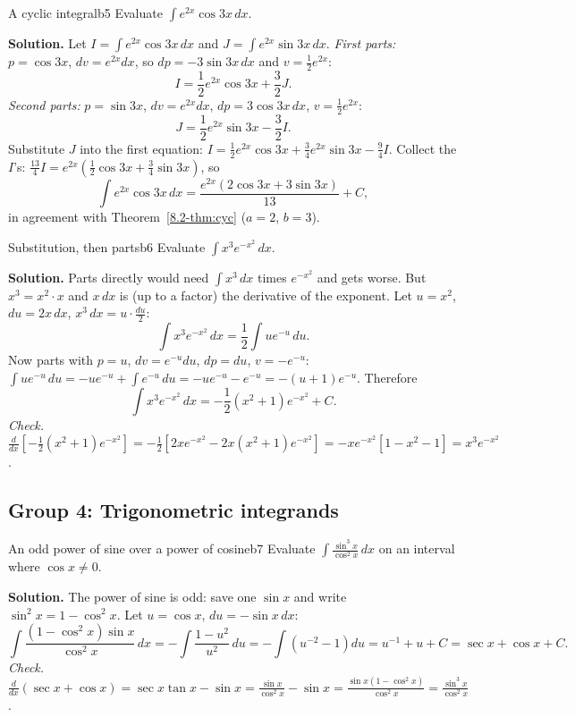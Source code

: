 \documentclass[11pt]{article}
\begin{document}
\begin{exmp}{A cyclic integral}{b5}
Evaluate $\displaystyle\int e^{2x}\cos3x\,dx$.

\textbf{Solution.} Let $I=\int e^{2x}\cos3x\,dx$ and $J=\int e^{2x}\sin3x\,dx$. \emph{First parts:} $p=\cos3x$, $dv=e^{2x}dx$, so $dp=-3\sin3x\,dx$ and $v=\frac12e^{2x}$:
\[I=\frac12e^{2x}\cos3x+\frac32J .\]
\emph{Second parts:} $p=\sin3x$, $dv=e^{2x}dx$, $dp=3\cos3x\,dx$, $v=\frac12e^{2x}$:
\[J=\frac12e^{2x}\sin3x-\frac32I .\]
Substitute $J$ into the first equation: $I=\frac12e^{2x}\cos3x+\frac34e^{2x}\sin3x-\frac94I$. Collect the $I$'s: $\frac{13}4I=e^{2x}\left(\frac12\cos3x+\frac34\sin3x\right)$, so
\[\int e^{2x}\cos3x\,dx=\frac{e^{2x}\left(2\cos3x+3\sin3x\right)}{13}+C ,\]
in agreement with Theorem~\ref{8.2-thm:cyc} ($a=2$, $b=3$).
\end{exmp}

\begin{exmp}{Substitution, then parts}{b6}
Evaluate $\displaystyle\int x^3e^{-x^2}\,dx$.

\textbf{Solution.} Parts directly would need $\int x^3\,dx$ times $e^{-x^2}$ and gets worse. But $x^3=x^2\cdot x$ and $x\,dx$ is (up to a factor) the derivative of the exponent. Let $u=x^2$, $du=2x\,dx$, $x^3\,dx=u\cdot\frac{du}2$:
\[\int x^3e^{-x^2}\,dx=\frac12\int ue^{-u}\,du .\]
Now parts with $p=u$, $dv=e^{-u}du$, $dp=du$, $v=-e^{-u}$: $\int ue^{-u}\,du=-ue^{-u}+\int e^{-u}\,du=-ue^{-u}-e^{-u}=-(u+1)e^{-u}$. Therefore
\[\int x^3e^{-x^2}\,dx=-\frac12\left(x^2+1\right)e^{-x^2}+C .\]
\emph{Check.} $\frac d{dx}\left[-\frac12(x^2+1)e^{-x^2}\right]=-\frac12\left[2xe^{-x^2}-2x(x^2+1)e^{-x^2}\right]=-xe^{-x^2}\left[1-x^2-1\right]=x^3e^{-x^2}$.
\end{exmp}

\subsection*{Group 4: Trigonometric integrands}

\begin{exmp}{An odd power of sine over a power of cosine}{b7}
Evaluate $\displaystyle\int\frac{\sin^3x}{\cos^2x}\,dx$ on an interval where $\cos x\ne0$.

\textbf{Solution.} The power of sine is odd: save one $\sin x$ and write $\sin^2x=1-\cos^2x$. Let $u=\cos x$, $du=-\sin x\,dx$:
\[\int\frac{(1-\cos^2x)\sin x}{\cos^2x}\,dx=-\int\frac{1-u^2}{u^2}\,du=-\int\left(u^{-2}-1\right)du=u^{-1}+u+C=\sec x+\cos x+C .\]
\emph{Check.} $\frac d{dx}(\sec x+\cos x)=\sec x\tan x-\sin x=\frac{\sin x}{\cos^2x}-\sin x=\frac{\sin x(1-\cos^2x)}{\cos^2x}=\frac{\sin^3x}{\cos^2x}$.
\end{exmp}
\end{document}
